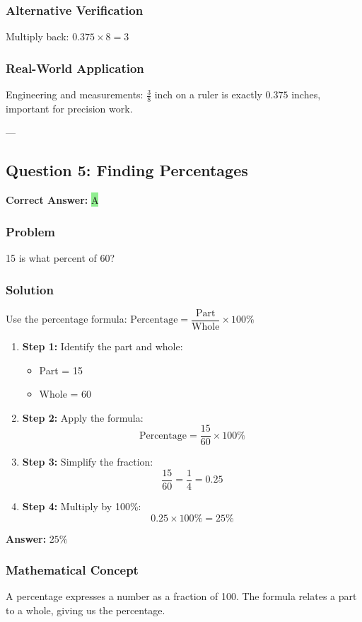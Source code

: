 \documentclass[12pt]{article}
\begin{document}
\subsubsection*{Alternative Verification}
Multiply back: $0.375 \times 8 = 3$ 

\subsubsection*{Real-World Application}
Engineering and measurements: $\frac{3}{8}$ inch on a ruler is exactly $0.375$ inches, important for precision work.

---

\subsection{Question 5: Finding Percentages}

\textbf{Correct Answer: } \colorbox{lightgreen}{A}

\subsubsection*{Problem}
15 is what percent of 60?

\subsubsection*{Solution}

Use the percentage formula: $\text{Percentage} = \dfrac{\text{Part}}{\text{Whole}} \times 100\%$

\begin{enumerate}
\item \textbf{Step 1:} Identify the part and whole:
  \begin{itemize}
  \item Part = 15
  \item Whole = 60
  \end{itemize}
\item \textbf{Step 2:} Apply the formula:
  \[
  \text{Percentage} = \frac{15}{60} \times 100\%
  \]
\item \textbf{Step 3:} Simplify the fraction:
  \[
  \frac{15}{60} = \frac{1}{4} = 0.25
  \]
\item \textbf{Step 4:} Multiply by 100\%:
  \[
  0.25 \times 100\% = 25\%
  \]
\end{enumerate}

\textbf{Answer: } $25\%$

\subsubsection*{Mathematical Concept}
A percentage expresses a number as a fraction of 100. The formula relates a part to a whole, giving us the percentage.
\end{document}
